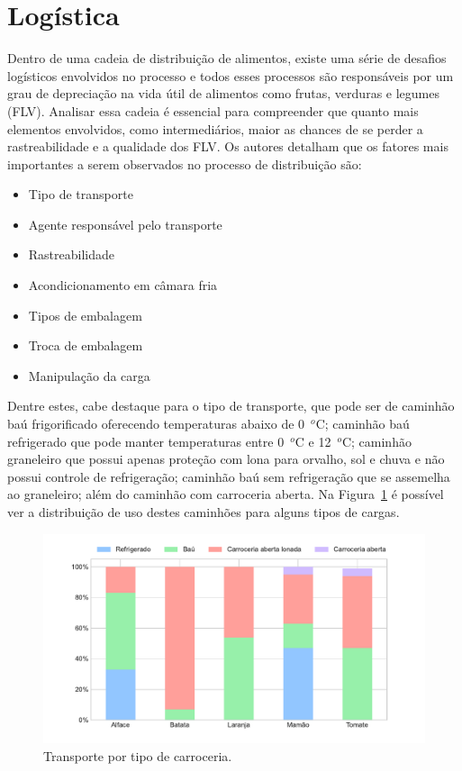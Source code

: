 \section{Logística}
Dentro de uma cadeia de distribuição de alimentos, existe uma série de desafios logísticos envolvidos no processo e todos esses processos são responsáveis por um grau de depreciação na vida útil de alimentos como frutas, verduras e legumes (FLV). Analisar essa cadeia é essencial para compreender que quanto mais elementos envolvidos, como intermediários, maior as chances de se perder a rastreabilidade e a qualidade dos FLV.
Os autores  detalham que os fatores mais importantes a serem observados no processo de distribuição são:
\begin{itemize}
    \item Tipo de transporte
    \item Agente responsável pelo transporte
    \item Rastreabilidade
    \item Acondicionamento em câmara fria
    \item Tipos de embalagem
    \item Troca de embalagem
    \item Manipulação da carga
\end{itemize}

Dentre estes, cabe destaque para o tipo de transporte, que pode ser de caminhão baú frigorificado oferecendo temperaturas abaixo de 0~$^o$C; caminhão baú refrigerado que pode manter temperaturas entre 0~$^o$C e 12~$^o$C; caminhão graneleiro que possui apenas proteção com lona para orvalho, sol e chuva e não possui controle de refrigeração; caminhão baú sem refrigeração que se assemelha ao graneleiro; além do caminhão com carroceria aberta. Na Figura~\ref{fig:transporte} é possível ver a distribuição de uso destes caminhões para alguns tipos de cargas.

\begin{figure}[h!]
  \caption{Transporte por tipo de carroceria.}
  \begin{center}
      \includegraphics[trim={0 1.2cm 0 0.5cm },scale=0.6]{img/transporte.pdf}
  \end{center}
  \label{fig:transporte}
\end{figure}

